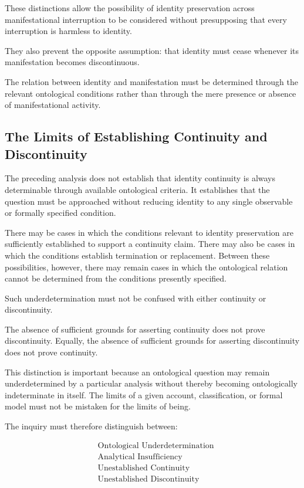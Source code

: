 These distinctions allow the possibility of identity preservation across
manifestational interruption to be considered without presupposing that
every interruption is harmless to identity.

They also prevent the opposite assumption: that identity must cease whenever
its manifestation becomes discontinuous.

The relation between identity and manifestation must be determined through
the relevant ontological conditions rather than through the mere presence
or absence of manifestational activity.

\subsection{The Limits of Establishing Continuity and Discontinuity}

The preceding analysis does not establish that identity continuity is
always determinable through available ontological criteria. It establishes
that the question must be approached without reducing identity to any
single observable or formally specified condition.

There may be cases in which the conditions relevant to identity preservation
are sufficiently established to support a continuity claim. There may also
be cases in which the conditions establish termination or replacement.
Between these possibilities, however, there may remain cases in which the
ontological relation cannot be determined from the conditions presently
specified.

Such underdetermination must not be confused with either continuity or
discontinuity.

The absence of sufficient grounds for asserting continuity does not prove
discontinuity. Equally, the absence of sufficient grounds for asserting
discontinuity does not prove continuity.

This distinction is important because an ontological question may remain
underdetermined by a particular analysis without thereby becoming
ontologically indeterminate in itself. The limits of a given account,
classification, or formal model must not be mistaken for the limits of
being.

The inquiry must therefore distinguish between:

\[
\begin{aligned}
&\text{Ontological Underdetermination} \\
&\text{Analytical Insufficiency} \\
&\text{Unestablished Continuity} \\
&\text{Unestablished Discontinuity}
\end{aligned}
\]

